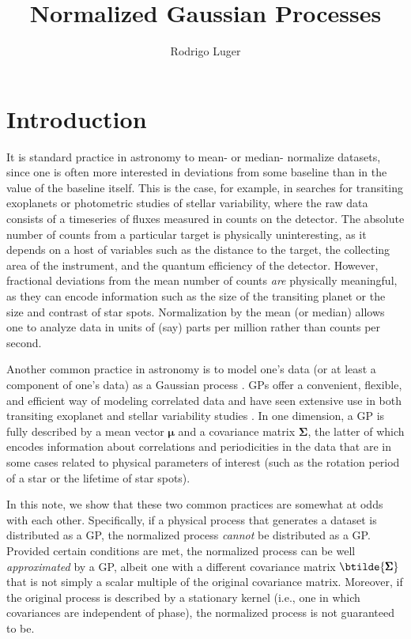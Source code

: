 \documentclass[modern]{aastex62}
\begin{document}
\title{%
    \textbf{
        Normalized Gaussian Processes
    }
}

\author{Rodrigo Luger}

\section{Introduction}

It is standard practice in astronomy to mean- or median- normalize datasets,
since one is often more interested in deviations from
some baseline than in the value of the baseline itself. This is the case,
for example, in searches for transiting exoplanets or photometric studies
of stellar variability, where the raw data
consists of a timeseries of fluxes measured in counts on the detector.
The absolute number of counts from a particular target is physically
uninteresting, as it depends on a host of variables such as the distance to
the target, the collecting area of the instrument, and the quantum efficiency of the
detector. However, fractional deviations from the mean number of counts
\emph{are} physically meaningful, as they can encode information such as the
size of the transiting planet or the size and contrast of star spots.
Normalization by the mean (or median) allows one to analyze data in units of (say)
parts per million rather than counts per second.

Another common practice in astronomy is to model one's data (or at least
a component of one's data) as a Gaussian process \citep[GP; e.g.,][]{RasmussenWilliams2005}.
GPs offer a convenient, flexible, and efficient way of modeling correlated
data and have seen extensive use in both transiting exoplanet and stellar
variability studies . In one dimension, a GP is fully described
by a mean vector $\pmb{\mu}$ and a covariance matrix $\pmb{\Sigma}$, the
latter of which encodes information about correlations and periodicities
in the data that are in some cases related to physical
parameters of interest (such as the rotation period of a star or the
lifetime of star spots).

In this note, we show that these two common practices are somewhat at odds
with each other. Specifically, if a physical process that generates
a dataset is distributed as a GP, the normalized process \emph{cannot} be
distributed as a GP. Provided certain conditions are met, the normalized
process can be well \emph{approximated} by a GP, albeit one with a different
covariance matrix $\btilde{\pmb{\Sigma}}$ that is not simply a scalar
multiple of the original covariance matrix. Moreover, if the original process
is described by a stationary kernel (i.e., one in which covariances are
independent of phase), the normalized process is not guaranteed to be.
\end{document}
